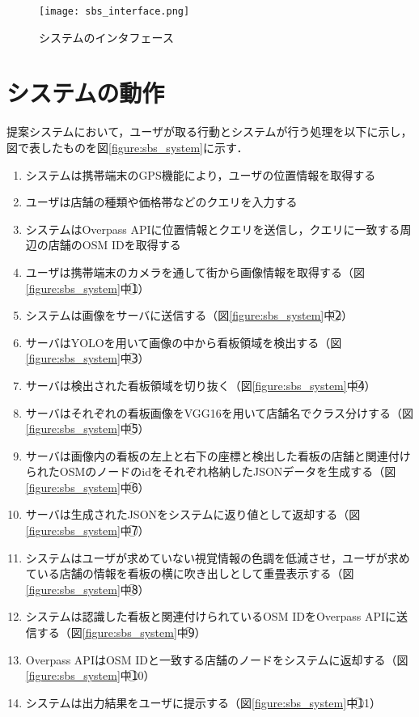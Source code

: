 \begin{figure}[tb]
  \centerline{\texttt{[image: sbs\_interface.png]}}
  \caption{システムのインタフェース}
  \label{figure:sbs_interface}
\end{figure}

\section{システムの動作}
  提案システムにおいて，ユーザが取る行動とシステムが行う処理を以下に示し，図で表したものを図\ref{figure:sbs_system}に示す．
  \begin{enumerate}
    \item システムは携帯端末のGPS機能により，ユーザの位置情報を取得する
    \item ユーザは店舗の種類や価格帯などのクエリを入力する
    \item システムはOverpass APIに位置情報とクエリを送信し，クエリに一致する周辺の店舗のOSM IDを取得する
    \item ユーザは携帯端末のカメラを通して街から画像情報を取得する（図\ref{figure:sbs_system}中\textcircled{\scriptsize 1}）
    \item システムは画像をサーバに送信する（図\ref{figure:sbs_system}中\textcircled{\scriptsize 2}）
    \item サーバはYOLOを用いて画像の中から看板領域を検出する（図\ref{figure:sbs_system}中\textcircled{\scriptsize 3}）
    \item サーバは検出された看板領域を切り抜く（図\ref{figure:sbs_system}中\textcircled{\scriptsize 4}）
    \item サーバはそれぞれの看板画像をVGG16を用いて店舗名でクラス分けする（図\ref{figure:sbs_system}中\textcircled{\scriptsize 5}）
    \item サーバは画像内の看板の左上と右下の座標と検出した看板の店舗と関連付けられたOSMのノードのidをそれぞれ格納したJSONデータを生成する（図\ref{figure:sbs_system}中\textcircled{\scriptsize 6}）
    \item サーバは生成されたJSONをシステムに返り値として返却する（図\ref{figure:sbs_system}中\textcircled{\scriptsize 7}）
    \item システムはユーザが求めていない視覚情報の色調を低減させ，ユーザが求めている店舗の情報を看板の横に吹き出しとして重畳表示する（図\ref{figure:sbs_system}中\textcircled{\scriptsize 8}）
    \item システムは認識した看板と関連付けられているOSM IDをOverpass APIに送信する（図\ref{figure:sbs_system}中\textcircled{\scriptsize 9}）
    \item Overpass APIはOSM IDと一致する店舗のノードをシステムに返却する（図\ref{figure:sbs_system}中\textcircled{\scriptsize 10}）
    \item システムは出力結果をユーザに提示する（図\ref{figure:sbs_system}中\textcircled{\scriptsize 11}）
  \end{enumerate}

